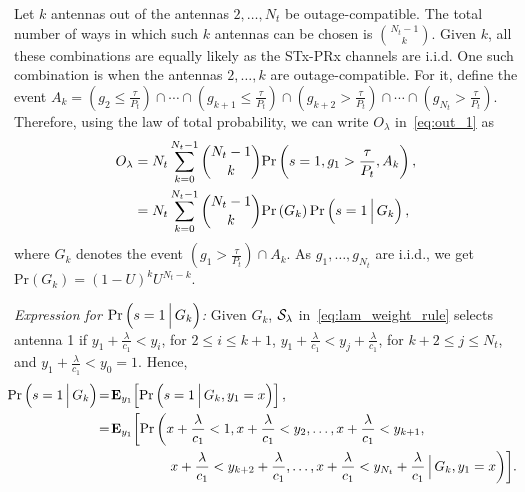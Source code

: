 \documentclass[12pt,draftcls,peerreview,onecolumn]{IEEEtran}
\newcommand{\brac}[1]{\left({#1}\right)}
\newcommand{\prob}[1]{\text{Pr}\brac{#1}}
\newcommand{\Given}{\Big\arrowvert}
\newcommand{\nck}[2]{\binom{#1}{#2}}
\newcommand{\setA}{A}
\newcommand{\setAk}{\setA_{k}}
\newcommand{\setG}{G}
\newcommand{\setGk}{\setG_k}
\newcommand{\lam}{\lambda}
\newcommand{\Nt}{{N_t}}
\newcommand{\Pt}{{P_t}}
\newcommand{\puch}{g}
\newcommand{\gk}[1]{{\puch_{#1}}}
\newcommand{\itau}{\tau}
\newcommand{\cone}{c_{1}}
\newcommand{\out}{O}
\newcommand{\taubypt}{\frac{\itau}{\Pt}}
\newcommand{\gkgrtaubypt}[1]{{\gk{#1}}>\taubypt}
\newcommand{\gklttaubypt}[1]{{\gk{#1}}\leq\taubypt}
\newcommand{\lambym}{\frac{\lam}{\cone}}
\newcommand{\yk}[1]{y_{#1}}
\newcommand{\ykplambym}[1]{\yk{#1}+\lambym}
\newcommand{\xplambym}{x+\lambym}
\newcommand{\un}{U}
\newcommand{\callamrule}{{\cal S_{{\lam}}}}
\newcommand{\outlam}{\out_{\lam}}
\begin{document}
Let $k$ antennas out of the antennas $2,\ldots,\Nt$ be outage-compatible. The total number of ways in which such $k$ antennas can be chosen is $\nck{\Nt-1}{k}$. Given $k$, all these combinations are equally likely as the STx-PRx channels are i.i.d. One such combination is when the antennas $2,\ldots,k$ are outage-compatible. For it, define the event   $\setAk=\left(\gklttaubypt{2}\right)\cap\cdots\cap\left(\gklttaubypt{k+1}\right)\cap\left( \gkgrtaubypt{k+2}\right)\cap\cdots\cap\left(\gkgrtaubypt{\Nt}\right)$. Therefore, using the law of total probability, we can write $\outlam$ in~\eqref{eq:out_1} as
%
\begin{align}
\outlam &=\Nt\sum_{k=0}^{\Nt-1}\nck{\Nt-1}{k} \text{Pr}\brac{s = 1,\gk{1}>\taubypt,\setAk}, \\
&=\Nt\sum_{k=0}^{\Nt-1}\nck{\Nt-1}{k}  \text{Pr}\brac{\setGk} \text{Pr}\brac{s = 1\Given \setGk},
\label{eq:out_3}
\end{align}
%
where $\setGk$ denotes the event  $\left(\gkgrtaubypt{1}\right)\cap\setAk $. As $\gk{1},\ldots,\gk{\Nt}$ are i.i.d., we get $\prob{\setGk} = \left(1-\un\right)^k\un^{\Nt-k}$.
%

{\em Expression for $\prob{s = 1\Given\setGk}$:} Given $\setGk$, $\callamrule$ in~\eqref{eq:lam_weight_rule} selects antenna 1 if $\ykplambym{1}<\yk{i}$, for $2\leq i \leq k+1$,  $\ykplambym{1}<\ykplambym{j}$, for $k+2\leq j \leq \Nt$, and $\ykplambym{1}<\yk{0}=1$. Hence,
%
\begin{align}
\label{eq:out_5}
\!\!\!\prob{s = 1\Given \setGk }&\!=\!{\bf{E}}_{\yk{1}}\!\left[\prob{s = 1\Given\setGk,\yk{1}=x}\right] ,\\
\label{eq:out_51}
&\!=\!{\bf{E}}_{\yk{1}}\!\left[\text{Pr}\left(\xplambym < 1, \xplambym<\yk{2}, \dots ,\xplambym<\yk{k+1},\right.\right.\nonumber\\
&\quad\quad\quad\quad\quad\left.\left.
\xplambym<\ykplambym{k+2}, \dots ,\xplambym < \ykplambym{\Nt}\Given\setGk,\yk{1}=x\right)\right]\!.
\end{align} 
%
\end{document}
